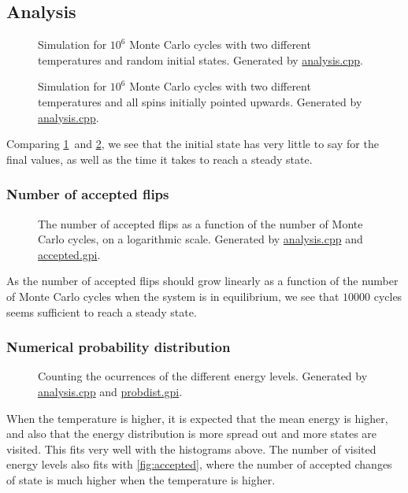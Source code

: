 \documentclass[12pt,english,a4paper]{article}
\newcommand{\program}[1]{\href{https://github.com/anjohan/Offentlig/blob/master/FYS3150/Oblig4/#1}{#1}}
\begin{document}
\subsection{Analysis}
\begin{figure}[H]
\centering
\caption{Simulation for \(10^6\) Monte Carlo cycles with two different temperatures and random initial states. Generated by \program{analysis.cpp}.}\label{2020random}
\end{figure}
\begin{figure}[H]
\centering
\caption{Simulation for \(10^6\) Monte Carlo cycles with two different temperatures and all spins initially pointed upwards. Generated by \program{analysis.cpp}.}\label{2020ordered}
\end{figure}
Comparing \ref{2020random} and \ref{2020ordered}, we see that the initial state has very little to say for the final values, as well as the time it takes to reach a steady state.

\subsubsection{Number of accepted flips}
\begin{figure}[H]
\centering

\caption{The number of accepted flips as a function of the number of Monte Carlo cycles, on a logarithmic scale. Generated by \program{analysis.cpp} and \program{accepted.gpi}.}\label{fig:accepted}
\end{figure}
As the number of accepted flips should grow linearly as a function of the number of Monte Carlo cycles when the system is in equilibrium, we see that \(\num{10000}\) cycles seems sufficient to reach a steady state.

\subsubsection{Numerical probability distribution}
\begin{figure}[H]
\centering

\caption{Counting the ocurrences of the different energy levels. Generated by \program{analysis.cpp} and \program{probdist.gpi}.}
\end{figure}
When the temperature is higher, it is expected that the mean energy is higher, and also that the energy distribution is more spread out and more states are visited. This fits very well with the histograms above. The number of visited energy levels also fits with \vref{fig:accepted}, where the number of accepted changes of state is much higher when the temperature is higher.





\clearpage
{}
\printbibliography
\end{document}
